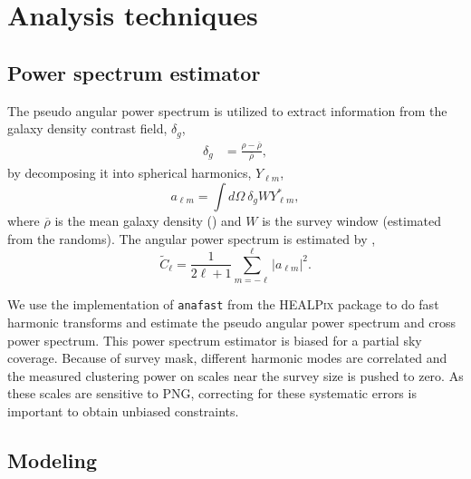 \section{Analysis techniques}
\label{sec:method} 
 
\subsection{Power spectrum estimator}
The pseudo angular power spectrum \citep{hivon2002master} is utilized to extract information from the galaxy density contrast field, $\delta_{g}$, 
\begin{align}\label{eq:delta}
    \delta_{g} &= \frac{\rho- \overline{\rho}}{\overline{\rho}},
\end{align}
by decomposing it into spherical harmonics, $Y_{\ell m}$,
\begin{equation}
        a_{\ell m} = \int d\Omega ~ \delta_{g} W Y^{*}_{\ell m},
\end{equation}
where $\overline{\rho}$ is the mean galaxy density () and $W$ is the survey window  (estimated from the randoms). The angular power spectrum is estimated by ,
\begin{equation}\label{eq:pusedocell}
        \tilde{C}_{\ell} = \frac{1}{2\ell +1} \sum_{m=-\ell}^{\ell} |a_{\ell m}|^{2}.
\end{equation}

We use the implementation of \texttt{anafast} from the \textsc{HEALPix} package \citep{gorski2005healpix} to do fast harmonic transforms and estimate the pseudo angular power spectrum and cross power spectrum. This power spectrum estimator is biased for a partial sky coverage. Because of survey mask, different harmonic modes are correlated and the measured clustering power on scales near the survey size is pushed to zero. As these scales are sensitive to PNG, correcting for these systematic errors is important to obtain unbiased constraints.

 \subsection{Modeling}

